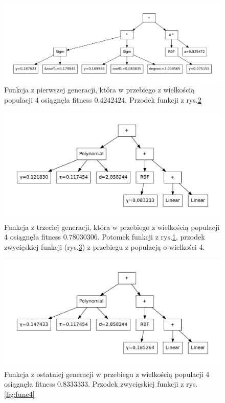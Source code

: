 	     \begin{figure}
		\includegraphics[scale=0.50]{figures/functions/func1}
		\caption{Funkcja z pierwszej generacji, która w przebiego z wielkością populacji 4 osiągnęła fitness $0.4242424$. Przodek funkcji z rys.\ref{fig:func2} \label{fig:func1}}
	\end{figure}
	
	\begin{figure}
		\includegraphics[scale=0.60]{figures/functions/func2}
		\caption{Funkcja z trzeciej generacji, która w przebiego z wielkością populacji 4 osiągnęła fitness $0.78030306$. Potomek funkcji z rys.\ref{fig:func1}, przodek zwycięskiej funkcji (rys.\ref{fig:func5}) z przebiegu z populacją o wielkości 4.\label{fig:func2}}
	\end{figure}
          
   	\begin{figure}
		\includegraphics[scale=0.60]{figures/functions/func5}
		\caption{Funkcja z ostatniej generacji w przebiegu z wielkością populacji 4 osiągnęła fitness $0.8333333$. Przodek zwycięskiej funkcji z rys.\ref{fig:func4} \label{fig:func5}}
	\end{figure}          


